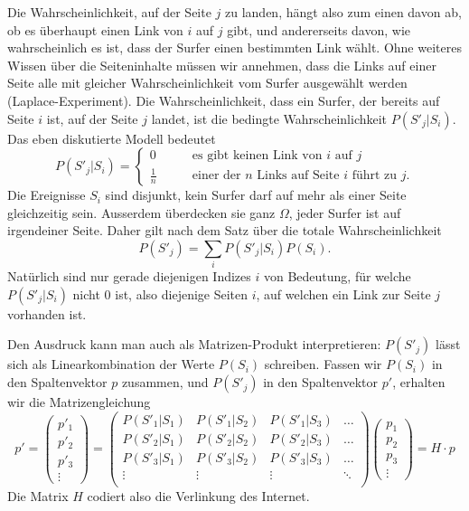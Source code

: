 Die Wahrscheinlichkeit, auf der Seite $j$ zu landen,
hängt also zum einen davon ab, ob es überhaupt
einen Link von $i$ auf $j$ gibt, und andererseits davon, wie wahrscheinlich
es ist, dass der Surfer einen bestimmten Link wählt.
Ohne weiteres Wissen über die Seiteninhalte müssen wir
annehmen, dass die Links auf einer Seite alle mit gleicher Wahrscheinlichkeit
vom Surfer ausgewählt werden (Laplace-Experiment).
Die Wahrscheinlichkeit, dass ein Surfer, der bereits
auf Seite $i$ ist, auf der Seite $j$ landet, ist die bedingte Wahrscheinlichkeit
$P(S'_j|S_i)$.
Das eben diskutierte Modell bedeutet
\[
P(S'_j|S_i)=\begin{cases}
0&\qquad\text{es gibt keinen Link von $i$ auf $j$}\\
\displaystyle\frac1n&\qquad\text{einer der $n$ Links auf Seite $i$ führt zu $j$}.
\end{cases}
\]
Die Ereignisse $S_i$ sind disjunkt, kein Surfer darf auf mehr als einer
Seite gleichzeitig sein.
Ausserdem überdecken sie ganz $\Omega$, jeder Surfer ist auf irgendeiner
Seite.
Daher gilt nach dem Satz über die totale Wahrscheinlichkeit
\[
P(S'_j)=\sum_{i}P(S'_j|S_i)P(S_i).
\]
Natürlich sind nur gerade diejenigen Indizes $i$ von Bedeutung, für welche $P(S'_j|S_i)$
nicht $0$ ist, also diejenige Seiten $i$, auf welchen ein Link zur Seite $j$
vorhanden ist.

Den Ausdruck kann man auch als Matrizen-Produkt interpretieren: $P(S'_j)$ lässt sich
als Linearkombination der Werte $P(S_i)$ schreiben.
Fassen wir $P(S_i)$ in den Spaltenvektor
$p$ zusammen, und $P(S'_j)$ in den Spaltenvektor $p'$, erhalten wir die Matrizengleichung
\[
p'=
\left(\begin{matrix}p'_1\\p'_2\\p'_3\\\vdots\end{matrix}\right)
=
\left(\begin{matrix}
P(S'_1|S_1)&P(S'_1|S_2)&P(S'_1|S_3)&\dots\\
P(S'_2|S_1)&P(S'_2|S_2)&P(S'_2|S_3)&\dots\\
P(S'_3|S_1)&P(S'_3|S_2)&P(S'_3|S_3)&\dots\\
\vdots&\vdots&\vdots&\ddots\\
\end{matrix}\right)
\left(\begin{matrix}p_1\\p_2\\p_3\\\vdots\end{matrix}\right)
=
H\cdot p
\]
Die Matrix $H$ codiert also die Verlinkung des Internet.

